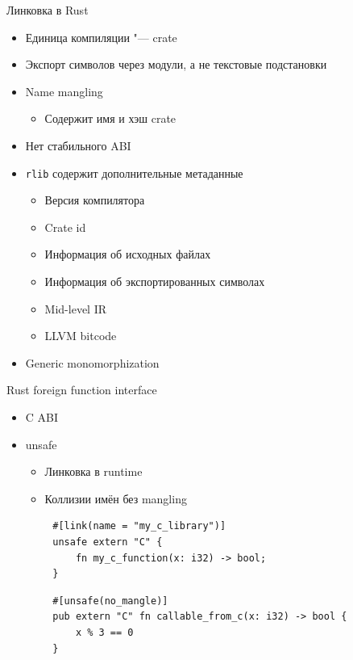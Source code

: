 \documentclass{beamer}
\begin{document}
\begin{frame}{Линковка в Rust}
    \begin{itemize}
        \item Единица компиляции "--- crate
        \item Экспорт символов через модули, а не текстовые подстановки
        \item Name mangling
            \begin{itemize}
                \item Содержит имя и хэш crate
            \end{itemize}
        \item Нет стабильного ABI
        \item \texttt{rlib} содержит дополнительные метаданные
            \begin{itemize}
                \item Версия компилятора
                \item Crate id
                \item Информация об исходных файлах
                \item Информация об экспортированных символах
                \item Mid-level IR
                \item LLVM bitcode
            \end{itemize}
        \item Generic monomorphization
    \end{itemize}
\end{frame}

\begin{frame}[fragile]{Rust foreign function interface}
    \begin{itemize}
        \item C ABI
        \item unsafe
            \begin{itemize}
                \item Линковка в runtime
                \item Коллизии имён без mangling
            \end{itemize}
    \end{itemize}

    \begin{verbatim}
        #[link(name = "my_c_library")]
        unsafe extern "C" {
            fn my_c_function(x: i32) -> bool;
        }
    \end{verbatim}

    \begin{verbatim}
        #[unsafe(no_mangle)]
        pub extern "C" fn callable_from_c(x: i32) -> bool {
            x % 3 == 0
        }
    \end{verbatim}
\end{frame}
\end{document}
